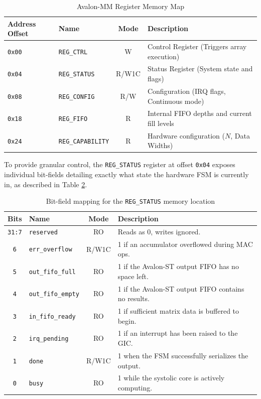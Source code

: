 \documentclass[12pt, letterpaper]{article}
\begin{document}
\begin{table}[h]
\centering
\renewcommand{\arraystretch}{1.2}
\begin{tabular}{llcl}
\toprule
\textbf{Address Offset} & \textbf{Name} & \textbf{Mode} & \textbf{Description} \\
\midrule
\texttt{0x00} & \texttt{REG\_CTRL} & W & Control Register (Triggers array execution) \\
\texttt{0x04} & \texttt{REG\_STATUS} & R/W1C & Status Register (System state and flags) \\
\texttt{0x08} & \texttt{REG\_CONFIG} & R/W & Configuration (IRQ flags, Continuous mode) \\
\texttt{0x18} & \texttt{REG\_FIFO} & R & Internal FIFO depths and current fill levels \\
\texttt{0x24} & \texttt{REG\_CAPABILITY} & R & Hardware configuration ($N$, Data Widths) \\
\bottomrule
\end{tabular}
\caption{Avalon-MM Register Memory Map}
\label{tab:reg_map}
\end{table}

To provide granular control, the \texttt{REG\_STATUS} register at offset \texttt{0x04} exposes individual bit-fields detailing exactly what state the hardware FSM is currently in, as described in Table \ref{tab:status_bits}.

\begin{table}[h]
\centering
\renewcommand{\arraystretch}{1.2}
\begin{tabular}{clcl}
\toprule
\textbf{Bits} & \textbf{Name} & \textbf{Mode} & \textbf{Description} \\
\midrule
\texttt{31:7} & \texttt{reserved} & RO & Reads as 0, writes ignored. \\
\texttt{6} & \texttt{err\_overflow} & R/W1C & 1 if an accumulator overflowed during MAC ops. \\
\texttt{5} & \texttt{out\_fifo\_full} & RO & 1 if the Avalon-ST output FIFO has no space left. \\
\texttt{4} & \texttt{out\_fifo\_empty} & RO & 1 if the Avalon-ST output FIFO contains no results. \\
\texttt{3} & \texttt{in\_fifo\_ready} & RO & 1 if sufficient matrix data is buffered to begin. \\
\texttt{2} & \texttt{irq\_pending} & RO & 1 if an interrupt has been raised to the GIC. \\
\texttt{1} & \texttt{done} & R/W1C & 1 when the FSM successfully serializes the output. \\
\texttt{0} & \texttt{busy} & RO & 1 while the systolic core is actively computing. \\
\bottomrule
\end{tabular}
\caption{Bit-field mapping for the \texttt{REG\_STATUS} memory location}
\label{tab:status_bits}
\end{table}
\end{document}
